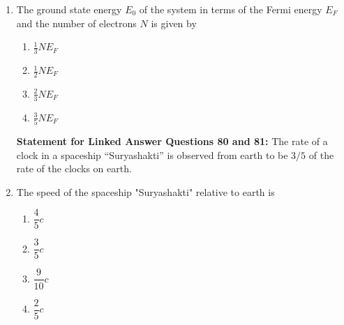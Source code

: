 \documentclass[journal,12pt,onecolumn]{IEEEtran}
\theoremstyle{remark}
\begin{document}
\begin{enumerate}
\item The ground state energy $E_0$ of the system in terms of the Fermi energy $E_F$ and the number of electrons $N$ is given by
\hfill{}
\begin{multicols}{4}
\begin{enumerate}
    \item $\tfrac{1}{3} N E_F$
    \item $\tfrac{1}{2} N E_F$
    \item $\tfrac{2}{3} N E_F$
    \item $\tfrac{3}{5} N E_F$
\end{enumerate}
\end{multicols}
\vspace{0.5 mm}
\textbf{Statement for Linked Answer Questions 80 and 81:} 
The rate of a clock in a spaceship ``Suryashakti'' is observed from earth to be ${3}/{5}$ of the rate of the clocks on earth.
\vspace{0.25 mm}

\item The speed of the spaceship "Suryashakti" relative to earth is
\hfill{}
\begin{multicols}{4}
\begin{enumerate}
    \item $\dfrac{4}{5}c$
    \item $\dfrac{3}{5}c$
    \item $\dfrac{9}{10}c$
    \item $\dfrac{2}{5}c$
\end{enumerate}
\end{multicols}


\end{enumerate}
\end{document}
